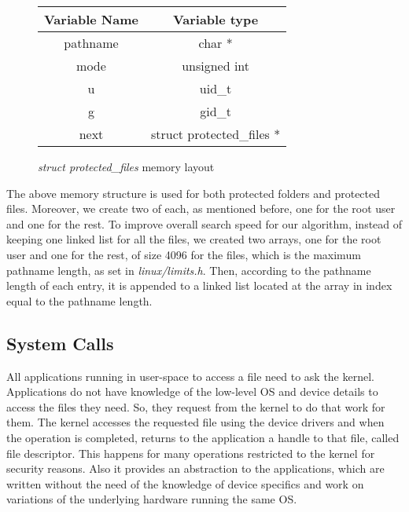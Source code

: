 \begin{figure}[ht]
	\centering
	\begin{tabular}{|c|c|}
		\hline
		\textbf{Variable Name} & \textbf{Variable type} \\
		\hline
		pathname & char * \\
		\hline
		mode & unsigned int \\
		\hline
		u & uid\_t \\
		\hline
		g & gid\_t \\
		\hline
		next & struct protected\_files * \\
		\hline
	\end{tabular}
	\caption{\textit{struct protected\_files} memory layout}
	\label{fig:sacl_layout}
\end{figure}

\par The above memory structure is used for both protected folders and protected files. Moreover, we create two of each, as mentioned before, one for the root user and one for the rest. To improve overall search speed for our algorithm, instead of keeping one linked list for all the files, we created two arrays, one for the root user and one for the rest, of size 4096 for the files, which is the maximum pathname length, as set in \textit{linux/limits.h}. Then, according to the pathname length of each entry, it is appended to a linked list located at the array in index equal to the pathname length.

\subsection{System Calls}\label{sub:syscalls}
All applications running in user-space to access a file need to ask the kernel. Applications do not have knowledge of the low-level \ac{OS} and device details to access the files they need. So, they request from the kernel to do that work for them. The kernel accesses the requested file using the device drivers and when the operation is completed, returns to the application a handle to that file, called file descriptor. This happens for many operations restricted to the kernel for security reasons. Also it provides an abstraction to the applications, which are written without the need of the knowledge of device specifics and work on variations of the underlying hardware running the same \ac{OS}. 

